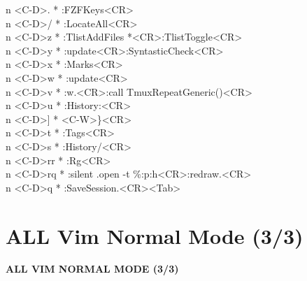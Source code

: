 \documentclass[11pt,a4paper,twoside]{book}
\begin{document}
n  <C-D>.  * :FZFKeys<CR>\\
n  <C-D>/  * :LocateAll<CR>\\
n  <C-D>z  * :TlistAddFiles *<CR>:TlistToggle<CR>\\
n  <C-D>y  * :update<CR>:SyntasticCheck<CR>\\
n  <C-D>x  * :Marks<CR>\\
n  <C-D>w  * :update<CR>\\
n  <C-D>v  * :w.<CR>:call TmuxRepeatGeneric()<CR>\\
n  <C-D>u  * :History:<CR>\\
n  <C-D>]  * <C-W>\}<CR>\\
n  <C-D>t  * :Tags<CR>\\
n  <C-D>s  * :History/<CR>\\
n  <C-D>rr  * :Rg<CR>\\
n  <C-D>rq  * :silent .open -t \%:p:h<CR>:redraw.<CR>\\
n  <C-D>q  * :SaveSession.<CR><Tab>\\


\vspace{16pt}

\section{ALL Vim Normal Mode (3/3)}


\vspace{10pt}
{\large\bfseries\color{neoncyan} ALL VIM NORMAL MODE (3/3)}\vspace{6pt}
\end{document}
